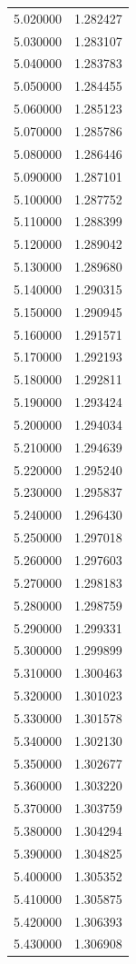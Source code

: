 \begin{tabular}{rr}
5.020000 & 1.282427 \\
5.030000 & 1.283107 \\
5.040000 & 1.283783 \\
5.050000 & 1.284455 \\
5.060000 & 1.285123 \\
5.070000 & 1.285786 \\
5.080000 & 1.286446 \\
5.090000 & 1.287101 \\
5.100000 & 1.287752 \\
5.110000 & 1.288399 \\
5.120000 & 1.289042 \\
5.130000 & 1.289680 \\
5.140000 & 1.290315 \\
5.150000 & 1.290945 \\
5.160000 & 1.291571 \\
5.170000 & 1.292193 \\
5.180000 & 1.292811 \\
5.190000 & 1.293424 \\
5.200000 & 1.294034 \\
5.210000 & 1.294639 \\
5.220000 & 1.295240 \\
5.230000 & 1.295837 \\
5.240000 & 1.296430 \\
5.250000 & 1.297018 \\
5.260000 & 1.297603 \\
5.270000 & 1.298183 \\
5.280000 & 1.298759 \\
5.290000 & 1.299331 \\
5.300000 & 1.299899 \\
5.310000 & 1.300463 \\
5.320000 & 1.301023 \\
5.330000 & 1.301578 \\
5.340000 & 1.302130 \\
5.350000 & 1.302677 \\
5.360000 & 1.303220 \\
5.370000 & 1.303759 \\
5.380000 & 1.304294 \\
5.390000 & 1.304825 \\
5.400000 & 1.305352 \\
5.410000 & 1.305875 \\
5.420000 & 1.306393 \\
5.430000 & 1.306908 \\

\end{tabular}
